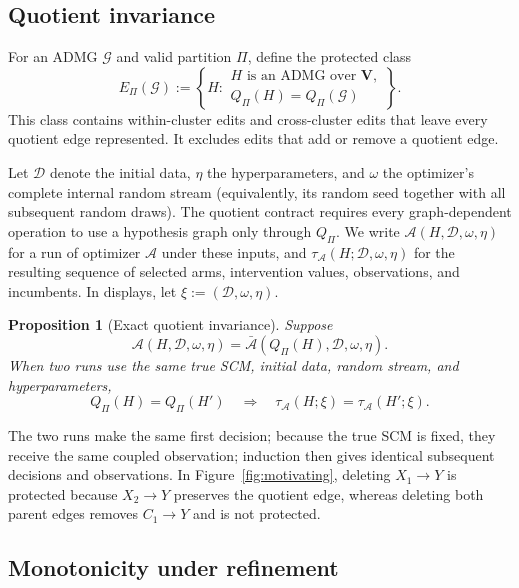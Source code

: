 \documentclass[twoside]{article}
\newtheorem{proposition}{Proposition}
\newcommand{\Gg}{\mathcal{G}}
\begin{document}
\subsection{Quotient invariance}
\label{sec:invariance}

For an ADMG $\Gg$ and valid partition $\Pi$, define the protected class
\begin{equation}
  E_\Pi(\Gg):=
  \left\{H:\substack{H\text{ is an ADMG over }\mathbf V,\\
  Q_\Pi(H)=Q_\Pi(\Gg)}\right\}.
  \label{eq:protected-class}
\end{equation}
This class contains within-cluster edits and cross-cluster edits that leave
every quotient edge represented. It excludes edits that add or remove a
quotient edge.

Let $\mathcal D$ denote the initial data, $\eta$ the hyperparameters, and
$\omega$ the optimizer's complete internal random stream (equivalently, its
random seed together with all subsequent random draws). The quotient
contract requires every graph-dependent operation to use a hypothesis graph
only through $Q_\Pi$. We write
$\mathcal A(H,\mathcal D,\omega,\eta)$ for a run of optimizer $\mathcal A$
under these inputs, and $\tau_{\mathcal A}(H;\mathcal D,\omega,\eta)$ for
the resulting sequence of selected arms, intervention values, observations,
and incumbents. In displays, let $\xi:=(\mathcal D,\omega,\eta)$.

\begin{proposition}[Exact quotient invariance]
\label{prop:contract}
Suppose
\[
 \mathcal A(H,\mathcal D,\omega,\eta)
 =\bar{\mathcal A}(Q_\Pi(H),\mathcal D,\omega,\eta).
\]
When two runs use the same true SCM, initial data, random stream, and
hyperparameters,
\[
 Q_\Pi(H)=Q_\Pi(H')
 \quad\Longrightarrow\quad
 \tau_{\mathcal A}(H;\xi)=\tau_{\mathcal A}(H';\xi).
\]
\end{proposition}

The two runs make the same first decision; because the true SCM is fixed,
they receive the same coupled observation; induction then gives identical
subsequent decisions and observations. In
Figure~\ref{fig:motivating}, deleting $X_1\to Y$ is protected because
$X_2\to Y$ preserves the quotient edge, whereas deleting both parent edges
removes $C_1\to Y$ and is not protected.

\subsection{Monotonicity under refinement}
\label{sec:price}
\end{document}
